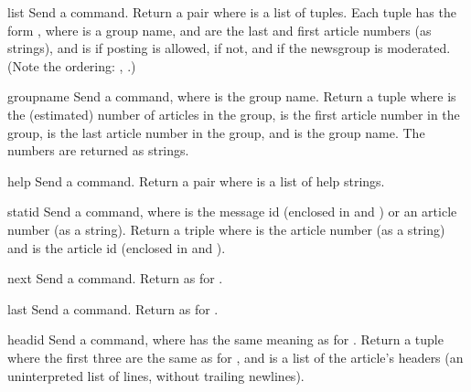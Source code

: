 \begin{methoddesc}{list}{}
Send a  command.  Return a pair  where  is a list of tuples.  Each tuple has the
form , where
 is a group name,  and  are the last
and first article numbers (as strings), and  is
 if posting is allowed,  if not, and  if
the newsgroup is moderated.  (Note the ordering: ,
.)
\end{methoddesc}

\begin{methoddesc}{group}{name}
Send a  command, where  is the group name.
Return a tuple  where  is the (estimated) number
of articles in the group,  is the first article number in
the group,  is the last article number in the group, and
 is the group name.  The numbers are returned as strings.
\end{methoddesc}

\begin{methoddesc}{help}{}
Send a  command.  Return a pair  where  is a list of help strings.
\end{methoddesc}

\begin{methoddesc}{stat}{id}
Send a  command, where  is the message id (enclosed
in \character{<} and \character{>}) or an article number (as a string).
Return a triple  where
 is the article number (as a string) and  is the
article id  (enclosed in \character{<} and \character{>}).
\end{methoddesc}

\begin{methoddesc}{next}{}
Send a  command.  Return as for .
\end{methoddesc}

\begin{methoddesc}{last}{}
Send a  command.  Return as for .
\end{methoddesc}

\begin{methoddesc}{head}{id}
Send a  command, where  has the same meaning as for
.  Return a tuple
where the first three are the same as for ,
and  is a list of the article's headers (an uninterpreted
list of lines, without trailing newlines).
\end{methoddesc}

